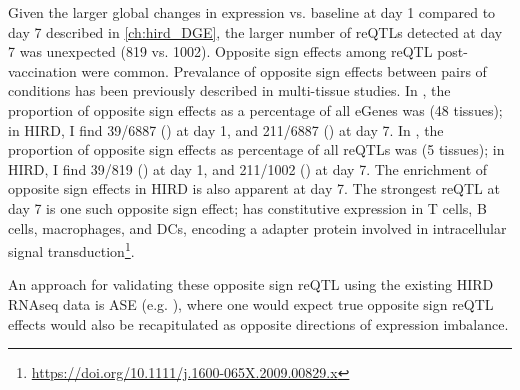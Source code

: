Given the larger global changes in expression vs. baseline at day 1 compared to day 7 described in \cref{ch:hird_DGE}, 
the larger number of \glspl{reQTL} detected at day 7 was unexpected (819 vs. 1002).
Opposite sign effects among \gls{reQTL} post-vaccination were common.
Prevalance of opposite sign effects between pairs of conditions has been previously described in multi-tissue studies.
In \autocite{mizuno2019BiologicalCharacterizationExpression}, the proportion of opposite sign effects as a percentage of all eGenes was  (48 tissues);
in \gls{HIRD}, I find
39/6887 () at day 1,
and 211/6887 () at day 7.
In \autocite{fu2012UnravelingRegulatoryMechanisms}, the proportion of opposite sign effects as percentage of all reQTLs was  (5 tissues);
in \gls{HIRD}, I find
39/819 () at day 1,
and 211/1002 () at day 7.
The enrichment of opposite sign effects in \gls{HIRD} is also apparent at day 7.
The strongest reQTL at day 7 is one such opposite sign effect;
 has constitutive expression in T cells, B cells, macrophages, and \glspl{DC}, 
encoding a adapter protein involved in intracellular signal transduction\footnote{\url{https://doi.org/10.1111/j.1600-065X.2009.00829.x}}.


An approach for validating these opposite sign \gls{reQTL} using the existing \gls{HIRD} \gls{RNAseq} data is \gls{ASE} (e.g. \autocite{kumasaka2016FinemappingCellularQTLs}),
where one would expect true opposite sign \gls{reQTL} effects would also be recapitulated as opposite directions of expression imbalance.

